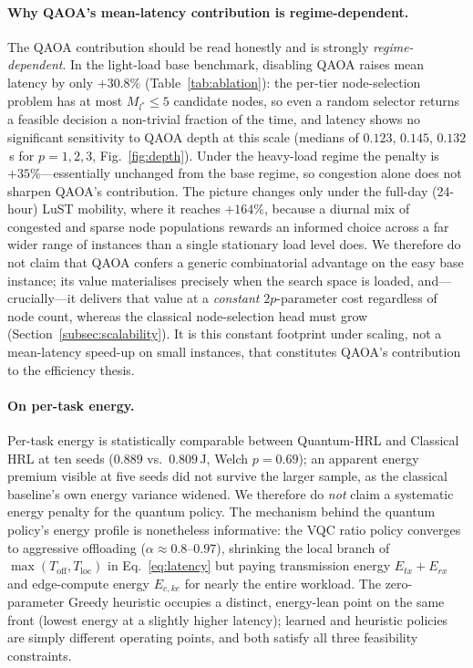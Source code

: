 \documentclass[11pt,a4paper]{article}
\theoremstyle{definition}
\begin{document}
\paragraph{Why QAOA's mean-latency contribution is regime-dependent.}
The QAOA contribution should be read honestly and is strongly \emph{regime-dependent}. In the light-load base benchmark, disabling QAOA raises mean latency by only $+30.8\%$ (Table~\ref{tab:ablation}): the per-tier node-selection problem has at most $M_{l^*}\!\leq\!5$ candidate nodes, so even a random selector returns a feasible decision a non-trivial fraction of the time, and latency shows no significant sensitivity to QAOA depth at this scale (medians of $0.123$, $0.145$, $0.132$\,s for $p{=}1,2,3$, Fig.~\ref{fig:depth}). Under the heavy-load regime the penalty is $+35\%$---essentially unchanged from the base regime, so congestion alone does not sharpen QAOA's contribution. The picture changes only under the full-day (24-hour) LuST mobility, where it reaches $+164\%$, because a diurnal mix of congested and sparse node populations rewards an informed choice across a far wider range of instances than a single stationary load level does. We therefore do not claim that QAOA confers a generic combinatorial advantage on the easy base instance; its value materialises precisely when the search space is loaded, and---crucially---it delivers that value at a \emph{constant} $2p$-parameter cost regardless of node count, whereas the classical node-selection head must grow (Section~\ref{subsec:scalability}). It is this constant footprint under scaling, not a mean-latency speed-up on small instances, that constitutes QAOA's contribution to the efficiency thesis.

\paragraph{On per-task energy.}
Per-task energy is statistically comparable between Quantum-HRL and Classical HRL at ten seeds ($0.889$ vs.\ $0.809$\,J, Welch $p=0.69$); an apparent energy premium visible at five seeds did not survive the larger sample, as the classical baseline's own energy variance widened. We therefore do \emph{not} claim a systematic energy penalty for the quantum policy. The mechanism behind the quantum policy's energy profile is nonetheless informative: the VQC ratio policy converges to aggressive offloading ($\alpha\!\approx\!0.8$--$0.97$), shrinking the local branch of $\max(T_{\mathrm{off}},T_{\mathrm{loc}})$ in Eq.~\eqref{eq:latency} but paying transmission energy $E_{tx}+E_{rx}$ and edge-compute energy $E_{c,ke}$ for nearly the entire workload. The zero-parameter Greedy heuristic occupies a distinct, energy-lean point on the same front (lowest energy at a slightly higher latency); learned and heuristic policies are simply different operating points, and both satisfy all three feasibility constraints.
\end{document}
